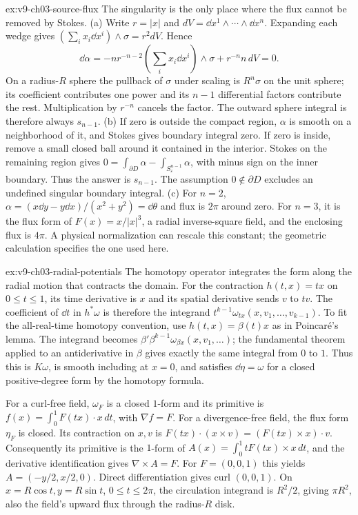 \begin{solution}{ex:v9-ch03-source-flux}
\idea The singularity is the only place where the flux cannot be removed by Stokes.
\writeup (a) Write $r=|x|$ and $dV=\dd x^1\wedge\cdots\wedge\dd x^n$. Expanding each wedge gives
$(\sum_i x_i\dd x^i)\wedge\sigma=r^2dV$. Hence
\[
\dd\alpha=-nr^{-n-2}\left(\sum_i x_i\dd x^i\right)\wedge\sigma
+r^{-n}n\,dV=0.
\]
On a radius-$R$ sphere the pullback of $\sigma$ under scaling is $R^n\sigma$ on the unit sphere; its coefficient contributes one power and its $n-1$ differential factors contribute the rest. Multiplication by $r^{-n}$ cancels the factor. The outward sphere integral is therefore always $s_{n-1}$.
(b) If zero is outside the compact region, $\alpha$ is smooth on a neighborhood of it, and Stokes gives boundary integral zero. If zero is inside, remove a small closed ball around it contained in the interior. Stokes on the remaining region gives
$0=\int_{\partial D}\alpha-\int_{S^{n-1}_\varepsilon}\alpha$, with minus sign on the inner boundary. Thus the answer is $s_{n-1}$. The assumption $0\notin\partial D$ excludes an undefined singular boundary integral.
(c) For $n=2$, $\alpha=(x\dd y-y\dd x)/(x^2+y^2)=\dd\theta$ and flux is $2\pi$ around zero. For $n=3$, it is the flux form of $F(x)=x/|x|^3$, a radial inverse-square field, and the enclosing flux is $4\pi$. A physical normalization can rescale this constant; the geometric calculation specifies the one used here.
\end{solution}

\begin{solution}{ex:v9-ch03-radial-potentials}
\idea The homotopy operator integrates the form along the radial motion that contracts the domain.
\writeup For the contraction $h(t,x)=tx$ on $0\le t\le1$, its time derivative is $x$ and its spatial derivative sends $v$ to $tv$. The coefficient of $\dd t$ in $h^*\omega$ is therefore the integrand $t^{k-1}\omega_{tx}(x,v_1,\ldots,v_{k-1})$. To fit the all-real-time homotopy convention, use $h(t,x)=\beta(t)x$ as in Poincar\'e's lemma. The integrand becomes $\beta'\beta^{k-1}\omega_{\beta x}(x,v_1,\ldots)$; the fundamental theorem applied to an antiderivative in $\beta$ gives exactly the same integral from $0$ to $1$. Thus this is $K\omega$, is smooth including at $x=0$, and satisfies $\dd\eta=\omega$ for a closed positive-degree form by the homotopy formula.

For a curl-free field, $\omega_F$ is a closed $1$-form and its primitive is
$f(x)=\int_0^1F(tx)\cdot x\,dt$, with $\nabla f=F$.
For a divergence-free field, the flux form $\eta_F$ is closed. Its contraction on $x,v$ is $F(tx)\cdot(x\times v)=(F(tx)\times x)\cdot v$. Consequently its primitive is the $1$-form of
$A(x)=\int_0^1tF(tx)\times x\,dt$, and the derivative identification gives $\nabla\times A=F$.
For $F=(0,0,1)$ this yields $A=(-y/2,x/2,0)$. Direct differentiation gives curl $(0,0,1)$. On $x=R\cos t,y=R\sin t$, $0\le t\le2\pi$, the circulation integrand is $R^2/2$, giving $\pi R^2$, also the field's upward flux through the radius-$R$ disk.
\end{solution}

